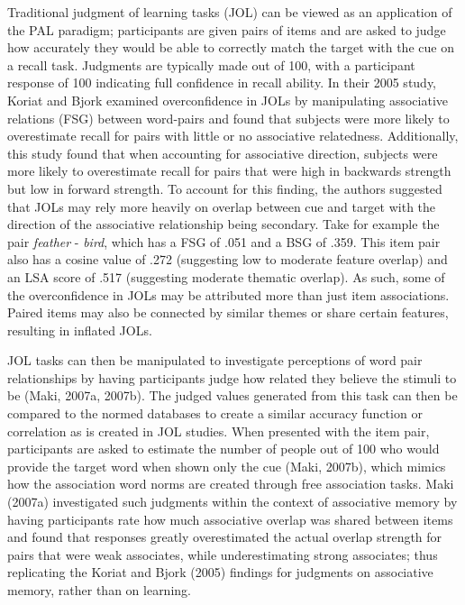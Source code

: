 \documentclass[english,man]{apa6}
\theoremstyle{definition}
\theoremstyle{definition}
\theoremstyle{definition}
\theoremstyle{remark}
\begin{document}
Traditional judgment of learning tasks (JOL) can be viewed as an
application of the PAL paradigm; participants are given pairs of items
and are asked to judge how accurately they would be able to correctly
match the target with the cue on a recall task. Judgments are typically
made out of 100, with a participant response of 100 indicating full
confidence in recall ability. In their 2005 study, Koriat and Bjork
examined overconfidence in JOLs by manipulating associative relations
(FSG) between word-pairs and found that subjects were more likely to
overestimate recall for pairs with little or no associative relatedness.
Additionally, this study found that when accounting for associative
direction, subjects were more likely to overestimate recall for pairs
that were high in backwards strength but low in forward strength. To
account for this finding, the authors suggested that JOLs may rely more
heavily on overlap between cue and target with the direction of the
associative relationship being secondary. Take for example the pair
\emph{feather} - \emph{bird}, which has a FSG of .051 and a BSG of .359.
This item pair also has a cosine value of .272 (suggesting low to
moderate feature overlap) and an LSA score of .517 (suggesting moderate
thematic overlap). As such, some of the overconfidence in JOLs may be
attributed more than just item associations. Paired items may also be
connected by similar themes or share certain features, resulting in
inflated JOLs.

JOL tasks can then be manipulated to investigate perceptions of word
pair relationships by having participants judge how related they believe
the stimuli to be (Maki, 2007a, 2007b). The judged values generated from
this task can then be compared to the normed databases to create a
similar accuracy function or correlation as is created in JOL studies.
When presented with the item pair, participants are asked to estimate
the number of people out of 100 who would provide the target word when
shown only the cue (Maki, 2007b), which mimics how the association word
norms are created through free association tasks. Maki (2007a)
investigated such judgments within the context of associative memory by
having participants rate how much associative overlap was shared between
items and found that responses greatly overestimated the actual overlap
strength for pairs that were weak associates, while underestimating
strong associates; thus replicating the Koriat and Bjork (2005) findings
for judgments on associative memory, rather than on learning.
\end{document}
